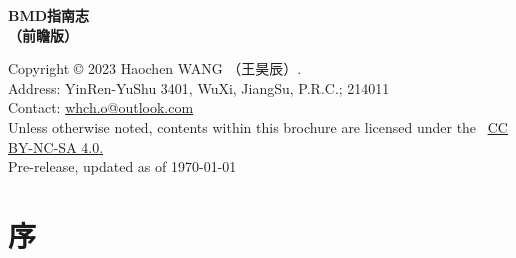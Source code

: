 \documentclass{article}
\begin{document}
\begin{titlepage} %



\begin{flushright} %
\fontsize{40}{0}\selectfont\textbf{BMD指南志\\（前瞻版）} %
\end{flushright}


\begin{flushright} %
\fontsize{28}{0} %
\end{flushright}


\begin{flushright} %
\fontsize{20}{0} %
\end{flushright}


\begin{flushright} 
\fontsize{16}{16}\selectfont
\footnotesize{Copyright © 2023 Haochen WANG （王昊辰）.}\\
\footnotesize{Address: YinRen-YuShu 3401, WuXi, JiangSu, P.R.C.; 214011}\\
\footnotesize{Contact: \href{mailto:whch.o@outlook.com}{whch.o@outlook.com}}\\
\footnotesize{Unless otherwise noted, contents within this brochure are licensed under the \ccbyncsa\ \href{http://creativecommons.org/licenses/by-nc-sa/4.0/}{\uline{CC BY-NC-SA 4.0}.}}\\
\footnotesize{Pre-release, updated as of \today}
\end{flushright}


\end{titlepage} %

\fancyfoot[L]{\textcolor{light-gray}{Copyright © 2023 by Haochen WANG （王昊辰）}} %


\tableofcontents %


\newpage %

{\section{序}
\fontsize{11}{15}\selectfont %


\newpage
\newpage
\newpage
}
\end{document}
